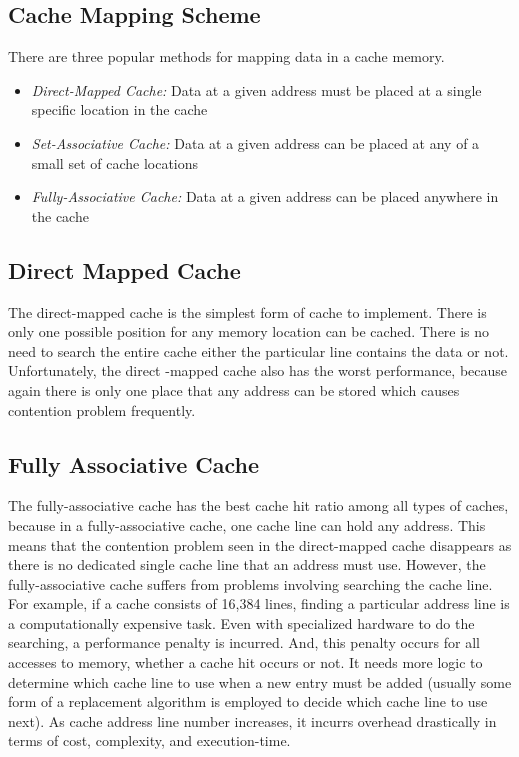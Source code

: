 \subsection{Cache Mapping Scheme}

There are three popular methods for mapping data in a cache memory.
\begin{itemize}

\item{\textit{Direct-Mapped Cache:}  Data at a given address must be placed at a single specific location in the cache}


\item{\textit{Set-Associative Cache:} Data at a given address can be placed at any of a small set of cache locations}
 
 
\item{\textit{Fully-Associative Cache:} Data at a given address can be placed anywhere in the cache}
 \end{itemize}
 
\subsection{Direct Mapped Cache}
The direct-mapped cache is the simplest form of cache to implement. There is only one possible position  for any memory location can be cached. There is no need to search the entire cache either the particular line contains the data or not. Unfortunately, the direct -mapped cache also has the worst performance, because again there is only one place that any address can be stored which causes contention problem frequently. 


\subsection{Fully Associative Cache}


The fully-associative cache has the best cache hit ratio among all types of caches, because in a fully-associative cache, one cache line can hold any address. This means that the contention problem seen in the direct-mapped cache disappears as there is no dedicated single cache line that an address must use. However, the fully-associative cache suffers from problems involving searching the cache line. For example, if a cache consists of 16,384 lines, finding a particular address line is a computationally expensive task. Even with specialized hardware to do the searching, a performance penalty is incurred. And, this penalty occurs for all accesses to memory, whether a cache hit occurs or not. It needs more logic to determine which cache line to use when a new entry must be added (usually some form of a replacement  algorithm is employed to decide which cache line to use next). As cache address line number increases, it incurrs overhead drastically in terms of cost, complexity, and execution-time.

